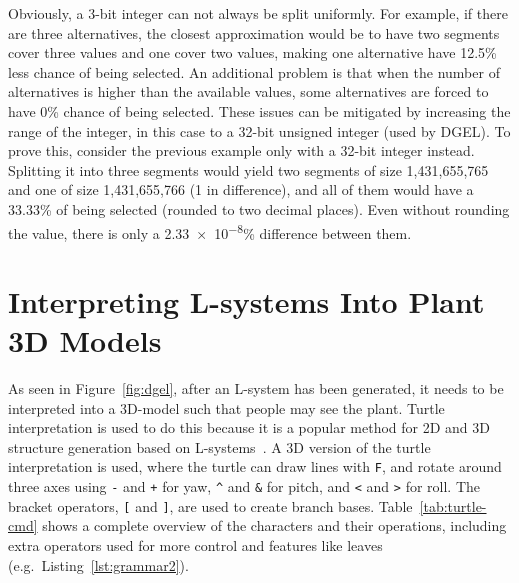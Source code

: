 Obviously, a 3-bit integer can not always be split uniformly.
For example, if there are three alternatives, the closest approximation would be to have two segments cover three values and one cover two values, making one alternative have 12.5\% less chance of being selected.
An additional problem is that when the number of alternatives is higher than the available values, some alternatives are forced to have 0\% chance of being selected.
These issues can be mitigated by increasing the range of the integer, in this case to a 32-bit unsigned integer (used by \gls{DGEL}).
To prove this, consider the previous example only with a 32-bit integer instead.
Splitting it into three segments would yield two segments of size 1,431,655,765 and one of size 1,431,655,766 (1 in difference), and all of them would have a 33.33\% of being selected (rounded to two decimal places).
Even without rounding the value, there is only a \num{2.33e-8}\% difference between them.

\section{Interpreting L-systems Into Plant 3D Models}
\label{sec:interpreting}
As seen in Figure~\ref{fig:dgel}, after an \gls{L-system} has been generated, it needs to be interpreted into a 3D-model such that people may see the plant.
Turtle interpretation is used to do this because it is a popular method for 2D and 3D structure generation based on \glspl{L-system}~\cite{2012Prusinkiewicz}.
A 3D version of the turtle interpretation is used, where the turtle can draw lines with \texttt{F}, and rotate around three axes using \texttt{-} and \texttt{+} for yaw, \texttt{\textasciicircum} and \texttt{\&} for pitch, and \texttt{<} and \texttt{>} for roll.
The bracket operators, \texttt{[} and \texttt{]}, are used to create \glspl{branch base}.
Table~\ref{tab:turtle-cmd} shows a complete overview of the characters and their operations, including extra operators used for more control and features like leaves (e.g.\ Listing~\ref{lst:grammar2}).

